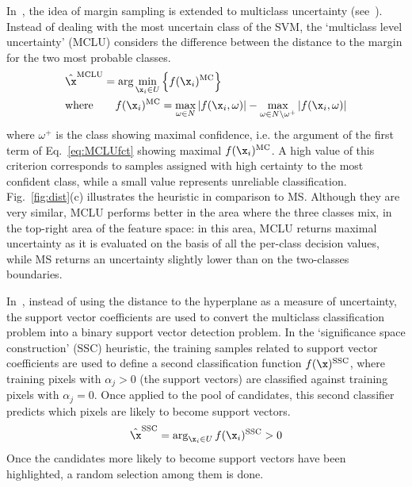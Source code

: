 \label{sec:MCLU}
In~, the idea of margin sampling is extended to multiclass uncertainty (see~). Instead of dealing with the most uncertain class of the SVM, the `multiclass level uncertainty' (MCLU) considers the difference between the distance to the margin for the two most probable classes. 
\begin{align}
&\hat{\x}^{\text{MCLU}} = \arg \min_{\x_i \in U} \Big\{f(\x_i)^{\text{MC}}\Big\}\label{eq:MCLU}\\
&\text{where} \qquad f(\x_i)^{\text{MC}} =  \max_{\omega \in N}|f(\x_i,\omega)|-\max_{\omega \in N\backslash \omega^+}|f(\x_i,\omega)|\label{eq:MCLUfct}
\end{align}
where $\omega^+$ is the class showing maximal confidence, i.e. the argument of the first term of Eq.~\eqref{eq:MCLUfct} showing maximal $f(\x_i)^{\text{MC}}$. A high value of this criterion corresponds to samples assigned with high certainty to the most confident class, while a small value represents unreliable classification. Fig.~\ref{fig:dist}(c) illustrates the heuristic in comparison to MS. Although they are very similar, MCLU performs better in the area where the three classes mix, in the top-right area of the feature space: in this area, MCLU returns maximal uncertainty as it is evaluated on the basis of all the per-class decision values, while MS returns an uncertainty slightly lower than on the two-classes boundaries.

In~, instead of using the distance to the hyperplane as a measure of uncertainty, the support vector coefficients are used to convert the multiclass classification problem into a binary support vector detection problem. In the `significance space construction' (SSC) heuristic, the training samples related to support vector coefficients are used to define a second classification function $f(\x)^{\text{SSC}}$, where training pixels with $\alpha_j > 0$ (the support vectors) are classified against training pixels with $\alpha_j = 0$. Once applied to the pool of candidates, this second classifier predicts which pixels are likely to become support vectors. 
\begin{equation}
\hat{\x}^{\text{SSC}} = \arg_{\x_i \in U}  f(\x_i)^{\text{SSC}} > 0
\label{eq:SSC}
\end{equation}
Once the candidates more likely to become support vectors have been highlighted, a random selection among them is done.


